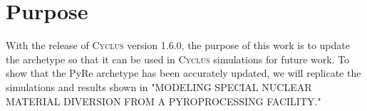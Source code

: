 \documentclass{anstrans}
\newcommand{\cyclus}{\textsc{Cyclus}\xspace}
\begin{document}
\section{Purpose}

With the release of \cyclus version 1.6.0, the purpose of this work is to update the archetype so that it can be used in \cyclus simulations for future work. To show that the PyRe archetype has been accurately updated, we will replicate the simulations and results shown in "MODELING SPECIAL NUCLEAR MATERIAL DIVERSION FROM A PYROPROCESSING FACILITY."




\end{document}
